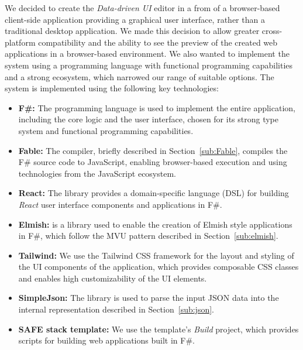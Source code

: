We decided to create the \emph{Data-driven UI} editor in a from of a browser-based client-side application providing a graphical user interface, rather than a traditional desktop application.
We made this decision to allow greater cross-platform compatibility and the ability to see the preview of the created web applications in a browser-based environment.
We also wanted to implement the system using a programming language with functional programming capabilities and a strong ecosystem, which narrowed our range of suitable options.
The system is implemented using the following key technologies:
\begin{itemize}
	\item \textbf{F\#:} The \citet{fsharp} programming language is used to implement the entire application, including the core logic and the user interface, chosen for its strong type system and functional programming capabilities.
	\item \textbf{Fable:} The \citet{fable} compiler, briefly described in Section~\ref{sub:Fable}, compiles the F\# source code to JavaScript, enabling browser-based execution and using technologies from the JavaScript ecosystem.
	\item \textbf{React:} The \citet{feliz} library provides a domain-specific language (DSL) for building \emph{React} user interface components and applications in F\#.
	\item \textbf{Elmish:} \citet{elmish} is a library used to enable the creation of Elmish style applications in F\#, which follow the MVU pattern described in Section~\ref{sub:elmish}.
	\item \textbf{Tailwind:} We use the Tailwind CSS framework for the layout and styling of the UI components of the application, which provides composable CSS classes and enables high customizability of the UI elements.
	\item \textbf{SimpleJson:} The \citet{simpleJson} library is used to parse the input JSON data into the internal representation described in Section~\ref{sub:json}.
	\item \textbf{SAFE stack template:} We use the \citet{safestack} template's \emph{Build} project, which provides scripts for building web applications built in F\#.
\end{itemize}


